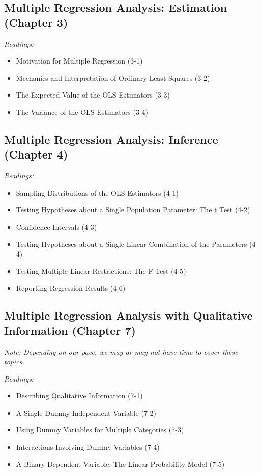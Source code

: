 \documentclass[11pt,letterpaper]{article}
\begin{document}
\subsection*{Multiple Regression Analysis: Estimation (Chapter 3)}
\textit{Readings:}
\begin{itemize}
    \item Motivation for Multiple Regression (3-1)
    \item Mechanics and Interpretation of Ordinary Least Squares (3-2)
    \item The Expected Value of the OLS Estimators (3-3)
    \item The Variance of the OLS Estimators (3-4)
\end{itemize}

\subsection*{Multiple Regression Analysis: Inference (Chapter 4)}
\textit{Readings:}
\begin{itemize}
    \item Sampling Distributions of the OLS Estimators (4-1)
    \item Testing Hypotheses about a Single Population Parameter: The t Test (4-2)
    \item Confidence Intervals (4-3)
    \item Testing Hypotheses about a Single Linear Combination of the Parameters (4-4)
    \item Testing Multiple Linear Restrictions: The F Test (4-5)
    \item Reporting Regression Results (4-6)
\end{itemize}

\subsection*{Multiple Regression Analysis with Qualitative Information (Chapter 7)}
\textit{Note: Depending on our pace, we may or may not have time to cover these topics.}

\textit{Readings:}
\begin{itemize}
    \item Describing Qualitative Information (7-1)
    \item A Single Dummy Independent Variable (7-2)
    \item Using Dummy Variables for Multiple Categories (7-3)
    \item Interactions Involving Dummy Variables (7-4)
    \item A Binary Dependent Variable: The Linear Probability Model (7-5)
\end{itemize}
\end{document}

